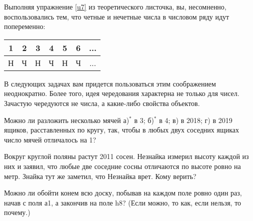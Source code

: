 Выполняя упражнение \ref{u7} из теоретического листочка, вы, несомненно, воспользовались тем, что четные и нечетные числа в числовом ряду идут попеременно:

\begin{table}[h]\centering
	\begin{tabular}{|c|c|c|c|c|c|c|}
		\hline
		1&2&3&4&5&6&...\\
		\hline
		Н&Ч&Н&Ч&Н&Ч&...\\
		\hline
	\end{tabular}
\end{table}

В следующих задачах вам придется пользоваться этим соображением неоднократно. Более того, идея чередования характерна не только для чисел. Зачастую чередуются не числа, а какие-либо свойства объектов.

\begin{thm}	\label{an3.2}
	Можно ли разложить несколько мячей а)$^\ast$ в 3; б)$^\ast$ в 4; в) в 2018; г) в 2019 ящиков, расставленных по кругу, так, чтобы в любых двух соседних ящиках число мячей отличалось на 1?
\end{thm}

\begin{thm}\label{1.9}
	Вокруг круглой поляны растут 2011 сосен. Незнайка измерил высоту каждой из них и заявил, что любые две соседние сосны отличаются по высоте ровно на метр. Знайка тут же заметил, что Незнайка врет. Кому верить?
\end{thm}

\begin{thm}\label{an5.1}
	Можно ли обойти конем всю доску, побывав на каждом поле ровно один раз, начав с поля а1, а закончив на поле h8? (Если можно, то как, если нельзя, то почему.)
\end{thm}

\newpage